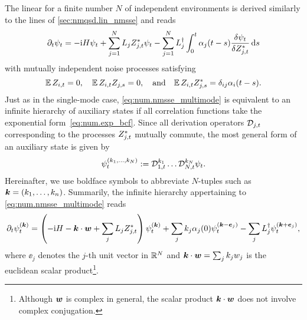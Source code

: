 The linear \NMSSE for a finite number $N$ of independent environments is derived similarly to the lines of \autoref{sec:nmqsd.lin_nmsse} and reads
\begin{equation}
  \partial_t \psit = -\ii\Hsys\psit + \sum_{j=1}^N L_j \ZZ_{j, t} \psit - \sum_{j=1}^N \adj{L}_j \int_0^t \alpha_j(t - s) \frac{\delta \psit}{\delta \ZZ_{j, t}} \dd s
  \label{eq:num.nmsse_multimode}
\end{equation}
with mutually independent noise processes satisfying
\begin{equation*}
  \E\,Z_{i, t} = 0, \quad \E\,Z_{i, t} Z_{j, s} =0, \quad\mbox{and}\quad \E\,Z_{i, t} \ZZ_{j, s} = \delta_{ij}\alpha_i(t-s).
\end{equation*}
Just as in the single-mode case, \autoref{eq:num.nmsse_multimode} is equivalent to an infinite hierarchy of auxiliary states if all correlation functions take the exponential form~\ref{eq:num.exp_bcf}.
Since all derivation operators $\mathcal{D}_{j, t}$ corresponding to the processes ${Z}^*_{j, t}$ mutually commute, the most general form of an auxiliary state is given by
\begin{equation}
  \psit[k_1, \dots, k_N] := \adjZZ_{1, t}^{k_1} \dots \adjZZ_{N, t}^{k_N} \psit.
  \label{eq:num.auxiliary_states_multi}
\end{equation}
Hereinafter, we use boldface symbols to abbreviate $N$-tuples such as $\boldsymbol{k} = (k_1,\dots,k_n)$.
Summarily, the infinite hierarchy appertaining to \autoref{eq:num.nmsse_multimode} reads
\begin{equation}
  \partial_t\psit[\kk] = \left( -\ii\Hsys - \kk\cdot\ww + \sum_j L_j \ZZ_{j, t} \right) \psit[\kk] + \sum_j k_j \alpha_j(0) \psit[\kk - \ee_j] - \sum_j \adj{L}_j \psit[\kk + \ee_j],
  \label{eq:num.hierarchy_lin_multi}
\end{equation}
where $\ee_j$ denotes the $j$-th unit vector in $\mathbb{R}^N$ and $\boldsymbol{k}\cdot\boldsymbol{w} = \sum_j k_jw_j$ is the euclidean scalar product\footnote{%
  Although $\boldsymbol{w}$ is complex in general, the scalar product $\boldsymbol{k}\cdot\boldsymbol{w}$ does not involve complex conjugation.
}.\\



